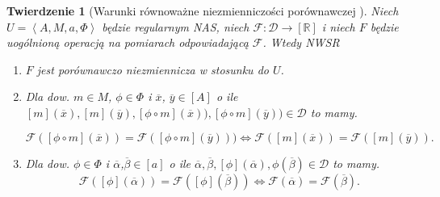 \documentclass[12pt,a4paper]{report}
\newtheorem{tw}[definition]{Twierdzenie}
\newcommand{\domkniecie}[1]{\left[ {#1} \right] }
\newcommand{\tuple}[1]{\left\langle {#1} \right\rangle}
\begin{document}
\begin{tw}[Warunki równoważne niezmienniczości porównawczej {\citep[Tw. 1]{adams1965theory}}]
Niech $U=\tuple{A,M,a,\Phi}$ będzie regularnym NAS, niech $\mathcal{F}:\mathcal{D}\to \domkniecie{\mathbb{R}}$ i niech $F$ będzie uogólnioną operacją na pomiarach odpowiadającą $\mathcal{F}$. Wtedy
NWSR
\begin{enumerate}
\item
$F$ jest porównawczo niezmiennicza w stosunku do $U$.
\item
Dla dow. $m \in M$, $\phi \in \Phi$ i $\overline{x}$, $\overline{y} \in \domkniecie{A}$ o ile $\domkniecie{m}(\overline{x}), \domkniecie{
m}(\overline{y}), \domkniecie{\phi\circ m}(\overline{x})), \domkniecie{\phi\circ m}(\overline{y})) \in \mathcal{D}$ to mamy.

$$
\mathcal{F}(\domkniecie{\phi \circ m}(\overline{x}))=\mathcal{F}(\domkniecie{\phi \circ m}(\overline{y}))) \iff \mathcal{F}(\domkniecie{m}(\overline{x}))=\mathcal{F}(\domkniecie{m}(\overline{y})).
$$
\item
Dla dow. $\phi \in \Phi$ i $\overline{\alpha}$,$ \overline{\beta} \in \domkniecie{a}$ o ile $\overline{\alpha}, \overline{\beta}, \domkniecie{\phi}(\overline{\alpha}), \phi(\overline{\beta}) \in \mathcal{D}$ to mamy.
\begin{equation*}
\mathcal{F}(\domkniecie{\phi}(\overline{\alpha}))=\mathcal{F}(\domkniecie{\phi}(\overline{\beta})) \iff \mathcal{F}(\overline{\alpha})=\mathcal{F}(\overline{\beta}).
\end{equation*}
\end{enumerate}

\end{tw}
\end{document}
